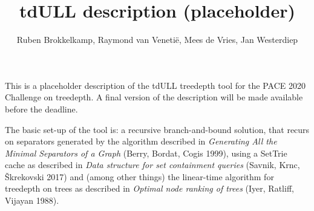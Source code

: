 \documentclass{article}
\author{Ruben Brokkelkamp, Raymond van Veneti\"e, Mees de Vries, Jan Westerdiep}
\title{tdULL description (placeholder)}
\begin{document}
\maketitle

This is a placeholder description of the tdULL treedepth tool for the PACE 2020
Challenge on treedepth. A final version of the description will be made
available before the deadline.

The basic set-up of the tool is: a recursive branch-and-bound solution, that
recurs on separators generated by the algorithm described in \emph{Generating
All the Minimal Separators of a Graph} (Berry, Bordat, Cogis 1999), using a
SetTrie cache as described in \emph{Data structure for set containment queries}
(Savnik, Krnc, \v Skrekovski 2017) and (among other things) the linear-time
algorithm for treedepth on trees as described in \emph{Optimal node ranking of
trees} (Iyer, Ratliff, Vijayan 1988). 
\end{document}
